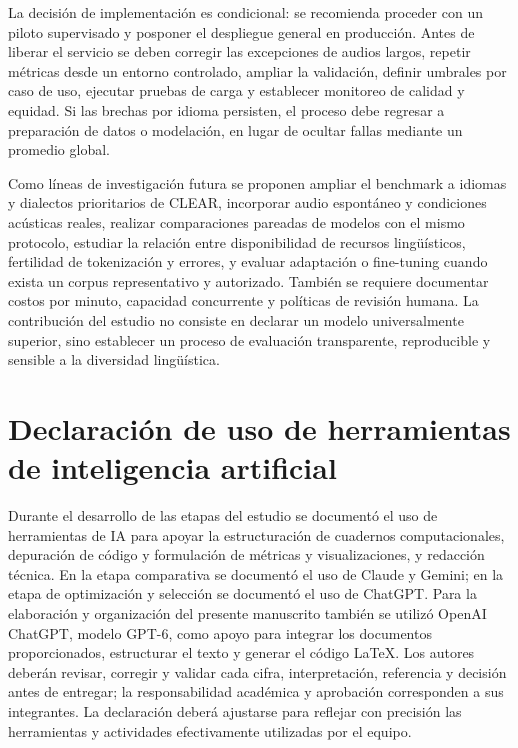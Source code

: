 \documentclass[11pt,letterpaper]{article}
\begin{document}
La decisión de implementación es condicional: se recomienda proceder con un piloto supervisado y posponer el despliegue general en producción. Antes de liberar el servicio se deben corregir las excepciones de audios largos, repetir métricas desde un entorno controlado, ampliar la validación, definir umbrales por caso de uso, ejecutar pruebas de carga y establecer monitoreo de calidad y equidad. Si las brechas por idioma persisten, el proceso debe regresar a preparación de datos o modelación, en lugar de ocultar fallas mediante un promedio global.

Como líneas de investigación futura se proponen ampliar el benchmark a idiomas y dialectos prioritarios de CLEAR, incorporar audio espontáneo y condiciones acústicas reales, realizar comparaciones pareadas de modelos con el mismo protocolo, estudiar la relación entre disponibilidad de recursos lingüísticos, fertilidad de tokenización y errores, y evaluar adaptación o fine-tuning cuando exista un corpus representativo y autorizado. También se requiere documentar costos por minuto, capacidad concurrente y políticas de revisión humana. La contribución del estudio no consiste en declarar un modelo universalmente superior, sino establecer un proceso de evaluación transparente, reproducible y sensible a la diversidad lingüística.

\section*{Declaración de uso de herramientas de inteligencia artificial}
Durante el desarrollo de las etapas del estudio se documentó el uso de herramientas de IA para apoyar la estructuración de cuadernos computacionales, depuración de código y formulación de métricas y visualizaciones, y redacción técnica. En la etapa comparativa se documentó el uso de Claude y Gemini; en la etapa de optimización y selección se documentó el uso de ChatGPT. Para la elaboración y organización del presente manuscrito también se utilizó OpenAI ChatGPT, modelo GPT-6, como apoyo para integrar los documentos proporcionados, estructurar el texto y generar el código \LaTeX. Los autores deberán revisar, corregir y validar cada cifra, interpretación, referencia y decisión antes de entregar; la responsabilidad académica y aprobación corresponden a sus integrantes. La declaración deberá ajustarse para reflejar con precisión las herramientas y actividades efectivamente utilizadas por el equipo.
\end{document}
